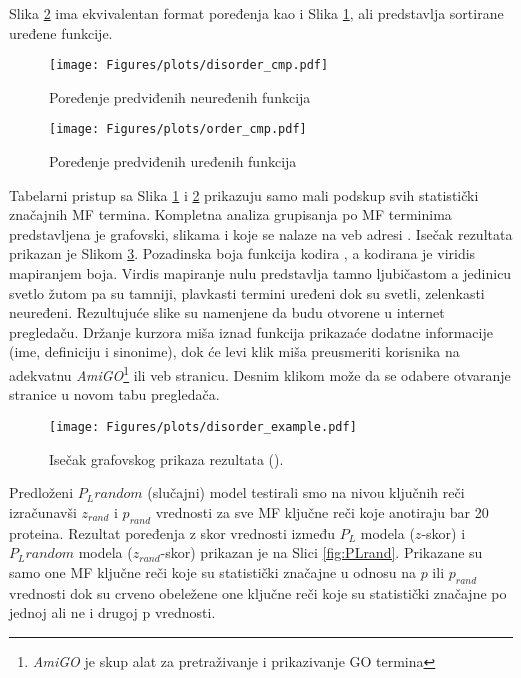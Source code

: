 Slika \ref{fig:order_cmp} ima ekvivalentan format poređenja kao i Slika
\ref{fig:disorder_cmp}, ali predstavlja sortirane uređene funkcije.



\clearpage

\begin{figure}[th]
\hspace*{-2.5cm} 
\texttt{[image: Figures/plots/disorder\_cmp.pdf]}
\decoRule
\caption {
  Poređenje predviđenih neuređenih funkcija
}
\label{fig:disorder_cmp}
\end{figure}

\begin{figure}[th]
\hspace*{-2.0cm} 
\texttt{[image: Figures/plots/order\_cmp.pdf]}
\decoRule
\caption {
  Poređenje predviđenih uređenih funkcija
}
\label{fig:order_cmp}
\end{figure}


\clearpage

Tabelarni pristup sa Slika \ref{fig:disorder_cmp} i \ref{fig:order_cmp}
prikazuju samo mali podskup svih statistički značajnih MF termina.  Kompletna
analiza grupisanja po MF terminima predstavljena je grafovski, slikama
 i  koje se nalaze na veb adresi
\cite{rezultati}.  Isečak rezultata  prikazan
je Slikom \ref{fig:disorder_example}.  Pozadinska boja funkcija kodira
, a kodirana je viridis \cite{viridis} mapiranjem
boja. Virdis mapiranje nulu predstavlja tamno ljubičastom a jedinicu svetlo
žutom pa su tamniji, plavkasti termini  uređeni dok su svetli, zelenkasti
neuređeni.  Rezultujuće  slike su namenjene da budu otvorene u
internet pregledaču.  Držanje kurzora miša iznad funkcija prikazaće dodatne
informacije (ime, definiciju i sinonime), dok će levi klik miša preusmeriti
korisnika na adekvatnu \textit{AmiGO}\footnote{\textit{AmiGO} je skup alat za
pretraživanje i prikazivanje GO termina } ili \uniprot veb stranicu. Desnim
klikom može da se odabere otvaranje stranice u novom tabu pregledača.

\begin{figure}[th]
\hspace*{-2.0cm} 
\texttt{[image: Figures/plots/disorder\_example.pdf]}
\caption {
  Isečak grafovskog prikaza rezultata ().
}
\label{fig:disorder_example}
\end{figure}


Predloženi $P_L random$ (slučajni) model testirali smo na nivou ključnih reči
izračunavši $z_{rand}$ i  $p_{rand}$ vrednosti za sve MF ključne reči koje
anotiraju bar 20 proteina. Rezultat poređenja z skor vrednosti između $P_L$
modela ($z$-skor) i $P_L random$ modela ($z_{rand}$-skor) prikazan je na Slici
\ref{fig:PLrand}. Prikazane su samo one MF ključne reči koje su statistički
značajne u odnosu na $p$ ili $p_{rand}$ vrednosti dok su crveno obeležene one
ključne reči koje su statistički značajne po jednoj ali ne i drugoj p
vrednosti.


